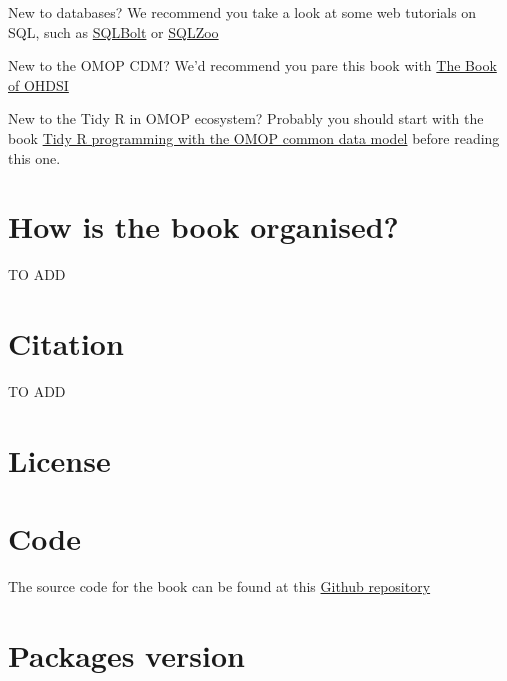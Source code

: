 \documentclass[
  letterpaper,
  oneside,
  open=any]{scrbook}
\begin{document}
New to databases? We recommend you take a look at some web tutorials on
SQL, such as \href{https://sqlbolt.com/}{SQLBolt} or
\href{https://www.sqlzoo.net/wiki/SQL_Tutorial}{SQLZoo}

New to the OMOP CDM? We'd recommend you pare this book with
\href{https://ohdsi.github.io/TheBookOfOhdsi/}{The Book of OHDSI}

New to the Tidy R in OMOP ecosystem? Probably you should start with the
book
\href{https://oxford-pharmacoepi.github.io/Tidy-R-programming-with-OMOP/}{Tidy
R programming with the OMOP common data model} before reading this one.

\section*{How is the book organised?}\label{how-is-the-book-organised}


TO ADD

\section*{Citation}\label{citation}


TO ADD

\section*{License}\label{license}


\section*{Code}\label{code}


The source code for the book can be found at this
\href{https://github.com/oxford-pharmacoepi/Phenotyping-in-OMOP}{Github
repository}

\section*{Packages version}\label{packages-version}
\end{document}
